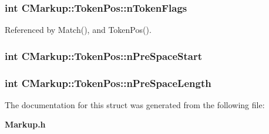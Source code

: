 \subsubsection[nTokenFlags]{\setlength{\rightskip}{0pt plus 5cm}int {\bf CMarkup::TokenPos::nTokenFlags}}\label{structCMarkup_1_1TokenPos_8eb640fe33ed145eb078e8214c0ea62b}




Referenced by Match(), and TokenPos().
\subsubsection[nPreSpaceStart]{\setlength{\rightskip}{0pt plus 5cm}int {\bf CMarkup::TokenPos::nPreSpaceStart}}\label{structCMarkup_1_1TokenPos_2d81fc5b589c491b450f73167ed9993d}


\subsubsection[nPreSpaceLength]{\setlength{\rightskip}{0pt plus 5cm}int {\bf CMarkup::TokenPos::nPreSpaceLength}}\label{structCMarkup_1_1TokenPos_455b67b62cfd4d6f6ffafc7b8bbc9971}




The documentation for this struct was generated from the following file:\begin{CompactItemize}
\item 
{\bf Markup.h}\end{CompactItemize}
